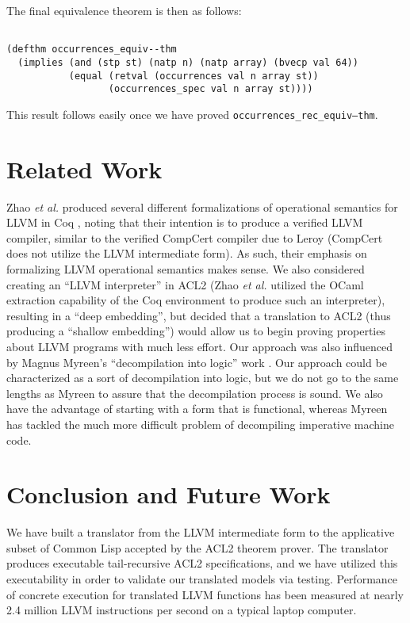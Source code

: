 \documentclass{eptcs}
\begin{document}
{\begin{verbatim}
\end{verbatim}

The final equivalence theorem is then as follows:

\begin{verbatim}

(defthm occurrences_equiv--thm
  (implies (and (stp st) (natp n) (natp array) (bvecp val 64))
           (equal (retval (occurrences val n array st))
                  (occurrences_spec val n array st))))

\end{verbatim}

This result follows easily once we have proved \texttt{occurrences\_rec\_equiv--thm}.

\section{Related Work}

Zhao \emph{et al.} \cite{Vellvm} produced several different
formalizations of operational semantics for LLVM in Coq
\cite{CoqRefMan}, noting that their intention is to produce a verified
LLVM compiler, similar to the verified CompCert compiler due to Leroy
\cite{Leroy2009} (CompCert does not utilize the LLVM intermediate
form).  As such, their emphasis on formalizing LLVM operational
semantics makes sense.  We also considered creating an ``LLVM
interpreter'' in ACL2 (Zhao \emph{et al.} utilized the OCaml
extraction capability of the Coq environment to produce such an
interpreter), resulting in a ``deep embedding'', but decided that a
translation to ACL2 (thus producing a ``shallow embedding'') would allow
us to begin proving properties about LLVM programs with much less
effort.  Our approach was also influenced by Magnus Myreen's
``decompilation into logic'' work \cite{decomp}.  Our approach could
be characterized as a sort of decompilation into logic, but we do not
go to the same lengths as Myreen to assure that the decompilation
process is sound.  We also have the advantage of starting with a form
that is functional, whereas Myreen has tackled the much more difficult
problem of decompiling imperative machine code.

\section{Conclusion and Future Work}

We have built a translator from the LLVM intermediate form to the
applicative subset of Common Lisp accepted by the ACL2 theorem prover.
The translator produces executable tail-recursive ACL2 specifications,
and we have utilized this executability in order to validate our
translated models via testing.  Performance of concrete execution for
translated LLVM functions has been measured at nearly 2.4 million LLVM
instructions per second on a typical laptop computer.

}
\end{document}

